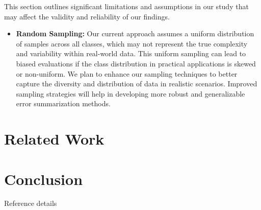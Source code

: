 \documentclass[10pt, conference, a4paper, final]{IEEEtran}
\begin{document}
This section outlines significant limitations and assumptions in our study that may affect the validity and reliability of our findings.

\begin{itemize}
    \item \textbf{Random Sampling:} Our current approach assumes a uniform distribution of samples across all classes, which may not represent the true complexity and variability within real-world data. This uniform sampling can lead to biased evaluations if the class distribution in practical applications is skewed or non-uniform. We plan to enhance our sampling techniques to better capture the diversity and distribution of data in realistic scenarios. Improved sampling strategies will help in developing more robust and generalizable error summarization methods.
\end{itemize}


\section{Related Work}

\section{Conclusion}

\begin{thebibliography}{01}
     Reference details
\end{thebibliography}
\end{document}
